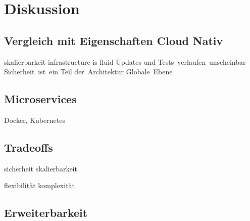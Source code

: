\chapter{Diskussion}

\section{Vergleich mit Eigenschaften Cloud Nativ}
skalierbarkeit
infrastructure is fluid
Updates und Tests verlaufen unscheinbar
Sicherheit ist ein Teil der Architektur
Globale Ebene

\section{Microservices}
 Docker, Kubernetes
 
\section{Tradeoffs}
sicherheit skalierbarkeit

flexibilität komplexität

\section{Erweiterbarkeit}